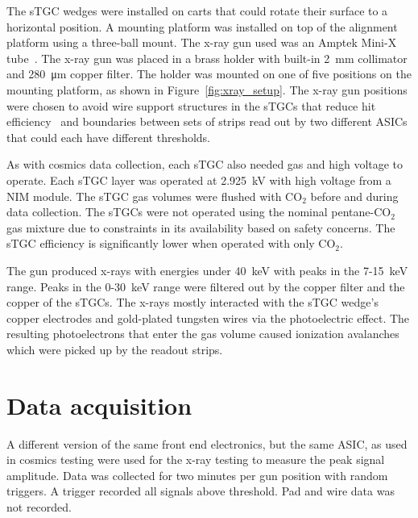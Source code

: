 The sTGC wedges were installed on carts that could rotate their surface to a horizontal position. A mounting platform was installed on top of the alignment platform using a three-ball mount. The x-ray gun used was an Amptek Mini-X tube~\cite{xray_gun}. The x-ray gun was placed in a brass holder with built-in \SI{2}{mm} collimator and \SI{280}{\micro\meter} copper filter. The holder was mounted on one of five positions on the mounting platform, as shown in Figure~\ref{fig:xray_setup}. The x-ray gun positions were chosen to avoid wire support structures in the sTGCs that reduce hit efficiency~\cite{lefebvre_thesis} and boundaries between sets of strips read out by two different ASICs that could each have different thresholds. 

As with cosmics data collection, each sTGC also needed gas and high voltage to operate. Each sTGC layer was operated at \SI{2.925}{kV} with high voltage from a NIM module. The sTGC gas volumes were flushed with CO$_2$ before and during data collection. The sTGCs were not operated using the nominal pentane-CO$_2$ gas mixture due to constraints in its availability based on safety concerns. The sTGC efficiency is significantly lower when operated with only CO$_2$.

The gun produced x-rays with energies under \SI{40}{\kilo\electronvolt} with peaks in the 7-\SI{15}{keV} range. Peaks in the 0-\SI{30}{keV} range were filtered out by the copper filter and the copper of the sTGCs. The x-rays mostly interacted with the sTGC wedge's copper electrodes and gold-plated tungsten wires via the photoelectric effect. The resulting photoelectrons that enter the gas volume caused ionization avalanches which were picked up by the readout strips.

\section{Data acquisition}

A different version of the same front end electronics, but the same ASIC, as used in cosmics testing were used for the x-ray testing to measure the peak signal amplitude. Data was collected for two minutes per gun position with random triggers. A trigger recorded all signals above threshold. Pad and wire data was not recorded.

